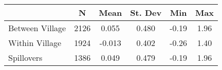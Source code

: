 \begin{tabular}{l*{5}{c}}\hline&\multicolumn{1}{c}{N}&\multicolumn{1}{c}{Mean}&\multicolumn{1}{c}{St. Dev}&\multicolumn{1}{c}{Min}&\multicolumn{1}{c}{Max}\\ \hline 
Between Village & 2126 & 0.055 & 0.480 & -0.19 & 1.96 \\
Within Village & 1924 & -0.013 & 0.402 & -0.26 & 1.40 \\
Spillovers & 1386 & 0.049 & 0.479 & -0.19 & 1.96 \\
\hline \end{tabular}
